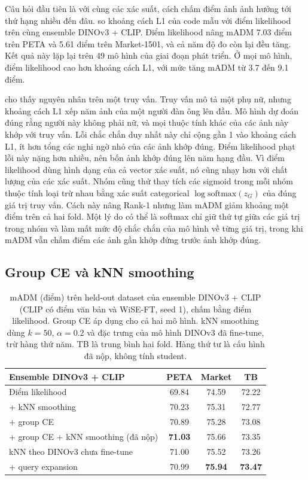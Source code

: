 \documentclass[10pt,twocolumn,letterpaper]{article}
\begin{document}
Câu hỏi đầu tiên là với cùng các xác suất, cách chấm điểm ảnh ảnh hưởng tới thứ hạng nhiều đến đâu.  so khoảng cách L1 của code mẫu với điểm likelihood trên cùng ensemble DINOv3 + CLIP. Điểm likelihood nâng mADM 7.03 điểm trên PETA và 5.61 điểm trên Market-1501, và cả năm độ đo còn lại đều tăng. Kết quả này lặp lại trên 49 mô hình của giai đoạn phát triển. Ở mọi mô hình, điểm likelihood cao hơn khoảng cách L1, với mức tăng mADM từ 3.7 đến 9.1 điểm.

 cho thấy nguyên nhân trên một truy vấn. Truy vấn mô tả một phụ nữ, nhưng khoảng cách L1 xếp năm ảnh của một người đàn ông lên đầu. Mô hình dự đoán đúng rằng người này không phải nữ, và mọi thuộc tính khác của các ảnh này khớp với truy vấn. Lỗi chắc chắn duy nhất này chỉ cộng gần 1 vào khoảng cách L1, ít hơn tổng các nghi ngờ nhỏ của các ảnh khớp đúng. Điểm likelihood phạt lỗi này nặng hơn nhiều, nên bốn ảnh khớp đúng lên năm hạng đầu. Vì điểm likelihood dùng hình dạng của cả vector xác suất, nó cũng nhạy hơn với chất lượng của các xác suất. Nhóm cũng thử thay tích các sigmoid trong mỗi nhóm thuộc tính loại trừ nhau bằng xác suất categorical $\log\mathrm{softmax}(z_G)$ của đúng giá trị truy vấn. Cách này nâng Rank-1 nhưng làm mADM giảm khoảng một điểm trên cả hai fold. Một lý do có thể là softmax chỉ giữ thứ tự giữa các giá trị trong nhóm và làm mất mức độ chắc chắn của mô hình về từng giá trị, trong khi mADM vẫn chấm điểm các ảnh gần khớp đứng trước ảnh khớp đúng.

\subsection{Group CE và kNN smoothing}
\label{sec:gce}

\begin{table}[t]
\centering
\small
\setlength{\tabcolsep}{3.5pt}
\begin{tabular}{@{}lccc@{}}
\toprule
Ensemble DINOv3 + CLIP & PETA & Market & TB \\
\midrule
Điểm likelihood & 69.84 & 74.59 & 72.22 \\
+ kNN smoothing & 70.23 & 75.31 & 72.77 \\
+ group CE & 70.89 & 75.28 & 73.08 \\
+ group CE + kNN smoothing (đã nộp) & \textbf{71.03} & 75.66 & 73.35 \\
\midrule
\quad kNN theo DINOv3 chưa fine-tune & 71.00 & 75.52 & 73.26 \\
\quad + query expansion & 70.99 & \textbf{75.94} & \textbf{73.47} \\
\bottomrule
\end{tabular}
\caption{mADM (điểm) trên held-out dataset của ensemble DINOv3 + CLIP (CLIP có điểm văn bản và WiSE-FT, seed 1), chấm bằng điểm likelihood. Group CE áp dụng cho cả hai mô hình. kNN smoothing dùng $k=50$, $\alpha=0.2$ và đặc trưng của mô hình DINOv3 đã fine-tune, trừ hàng thứ năm. TB là trung bình hai fold. Hàng thứ tư là cấu hình đã nộp, không tính student.}
\label{tab:gce}
\end{table}
\end{document}
